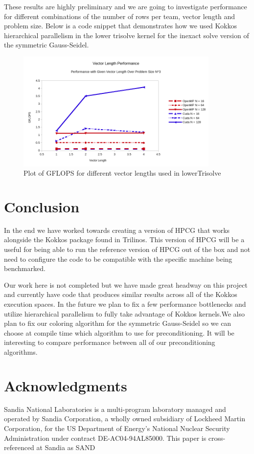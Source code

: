 \documentclass{ccr15}
\begin{document}
These results
are highly preliminary and we are going to investigate performance for different combinations of the number of rows per team, vector length and problem size.
Below is a code snippet that demonstrates how we used Kokkos hierarchical parallelism in the lower trisolve
kernel for the inexact solve version of the symmetric Gauss-Seidel.

\begin{figure}[h]
  \centering
  \includegraphics[width=10cm]{plots/ZAB-CombinedVectorLength.png}
  \caption{Plot of GFLOPS for different vector lengths used in lowerTrisolve}
  \label{vlength}
\end{figure}

\section{Conclusion}
In the end we have worked towards creating a version of HPCG that works alongside the Kokkos
package found in Trilinos. This version of HPCG will be a useful for being able to run the reference
version of HPCG out of the box and not need to configure the code to be compatible with the
specific machine being benchmarked.

Our work here is not completed but we have made great headway on this project and currently have
code that produces similar results across all of the Kokkos execution spaces. In the future we plan to
fix a few performance bottlenecks and utilize hierarchical parallelism to fully take advantage of Kokkos
kernels.We also plan to fix our coloring algorithm for the symmetric Gauss-Seidel so we can choose at
compile time which algorithm to use for preconditioning. It will be interesting to compare performance
between all of our preconditioning algorithms.
\section{Acknowledgments}
Sandia National Laboratories is a multi-program laboratory managed and operated by Sandia Corporation, a wholly owned subsidiary of Lockheed Martin Corporation, for the US Department of Energy{'}s National Nuclear Security Administration under contract DE-AC04-94AL85000. This paper is cross-referenced at Sandia as SAND
\end{document}
